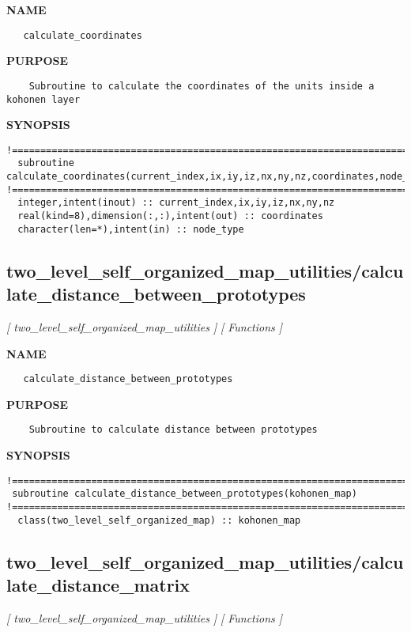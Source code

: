 \documentclass{article}
\begin{document}
\label{ch:robo62}
\label{ch:two_level_self_organized_map_utilities_calculate_coordinates}
\textbf{NAME}
\begin{verbatim}
   calculate_coordinates
\end{verbatim}
\textbf{PURPOSE}
\begin{verbatim}
    Subroutine to calculate the coordinates of the units inside a kohonen layer 
\end{verbatim}
\textbf{SYNOPSIS}
\begin{verbatim}
!========================================================================================
  subroutine calculate_coordinates(current_index,ix,iy,iz,nx,ny,nz,coordinates,node_type)
!========================================================================================
  integer,intent(inout) :: current_index,ix,iy,iz,nx,ny,nz
  real(kind=8),dimension(:,:),intent(out) :: coordinates
  character(len=*),intent(in) :: node_type
\end{verbatim}
\newpage
\subsection{two\_level\_self\_organized\_map\_utilities/calculate\_distance\_between\_prototypes}
\textsl{[ two\_level\_self\_organized\_map\_utilities ]}
\textsl{[ Functions ]}

\label{ch:robo63}
\label{ch:two_level_self_organized_map_utilities_calculate_distance_between_prototypes}
\textbf{NAME}
\begin{verbatim}
   calculate_distance_between_prototypes
\end{verbatim}
\textbf{PURPOSE}
\begin{verbatim}
    Subroutine to calculate distance between prototypes
\end{verbatim}
\textbf{SYNOPSIS}
\begin{verbatim}
!========================================================================================
 subroutine calculate_distance_between_prototypes(kohonen_map)
!========================================================================================
  class(two_level_self_organized_map) :: kohonen_map
\end{verbatim}
\newpage
\subsection{two\_level\_self\_organized\_map\_utilities/calculate\_distance\_matrix}
\textsl{[ two\_level\_self\_organized\_map\_utilities ]}
\textsl{[ Functions ]}
\end{document}
